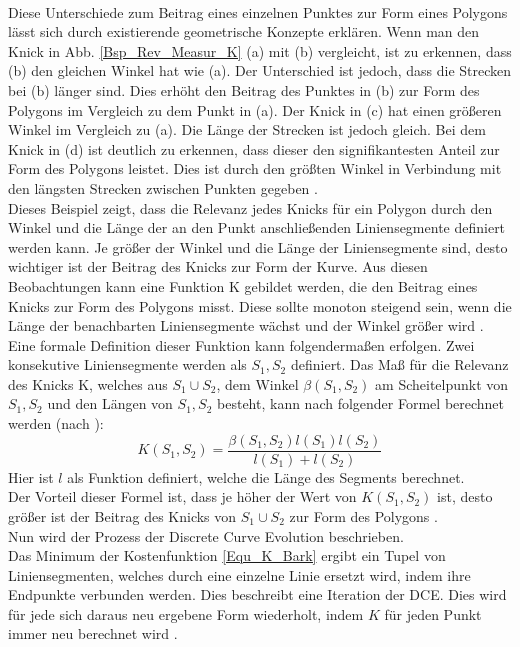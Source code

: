 {\\
Diese Unterschiede zum Beitrag eines einzelnen Punktes zur Form eines Polygons lässt sich durch existierende geometrische Konzepte erklären. Wenn man den Knick in Abb. \ref{Bsp_Rev_Measur_K} (a) mit (b) vergleicht, ist zu erkennen, dass (b) den gleichen Winkel hat wie (a). Der Unterschied ist jedoch, dass die Strecken bei (b) länger sind. Dies erhöht den Beitrag des Punktes in (b) zur Form des Polygons im Vergleich zu dem Punkt in (a).
Der Knick in (c) hat einen größeren Winkel im Vergleich zu (a). Die Länge der Strecken ist jedoch gleich. Bei dem Knick in (d) ist deutlich zu erkennen, dass dieser den signifikantesten Anteil zur Form des Polygons leistet. Dies ist durch den größten Winkel in Verbindung mit den längsten Strecken zwischen Punkten gegeben \citep{Barkowsky2000}.
\\
Dieses Beispiel zeigt, dass die Relevanz jedes Knicks für ein Polygon durch den Winkel und die Länge der an den Punkt anschließenden Liniensegmente definiert werden kann. Je größer der Winkel und die Länge der Liniensegmente sind, desto wichtiger ist der Beitrag des Knicks zur Form der Kurve. Aus diesen Beobachtungen kann eine Funktion K gebildet werden, die den Beitrag eines Knicks zur Form des Polygons misst. Diese sollte monoton steigend sein, wenn die Länge der benachbarten Liniensegmente wächst und der Winkel größer wird \citep{Barkowsky2000}.
\\
Eine formale Definition dieser Funktion kann folgendermaßen erfolgen. Zwei konsekutive Liniensegmente werden als $S_1, S_2$ definiert. Das Maß für die Relevanz des Knicks K, welches aus $S_1 \cup S_2$, dem Winkel  $\beta(S_1, S_2)$ am Scheitelpunkt von $S_1,  S_2$ und den Längen von $S_1, S_2$ besteht, kann nach folgender Formel berechnet werden (nach \citet{Latecki1999a}):
\\
\begin{equation}
	K(S_1,S_2) = \frac{\beta(S_1,S_2)l(S_1)l(S_2)}{l(S_1) + l(S_2)} 
	\label{Equ_K_Bark} 
\end{equation}
 Hier ist $l$ als Funktion definiert, welche die Länge des Segments berechnet. \\
 Der Vorteil dieser Formel ist, dass je höher der Wert von $K(S_1, S_2)$ ist, desto größer ist der Beitrag des Knicks von $S_1 \cup S_2$ zur Form des Polygons \citep{Barkowsky2000}.
 \\
 Nun wird der Prozess der \glqq Discrete Curve Evolution\grqq{} beschrieben.\\ Das Minimum der Kostenfunktion \ref{Equ_K_Bark} ergibt ein Tupel von Liniensegmenten, welches durch eine einzelne Linie ersetzt wird, indem ihre Endpunkte verbunden werden. Dies beschreibt eine Iteration der DCE. Dies wird für jede sich daraus neu ergebene Form wiederholt, indem $K$ für jeden Punkt immer neu berechnet wird \citep{Barkowsky2000}.
}
